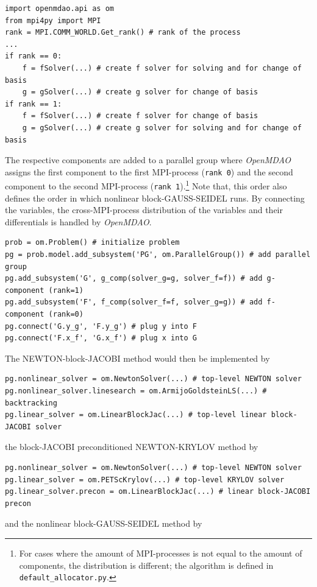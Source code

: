 \documentclass[10pt, ngerman, english,
twoside, open=right,
numbers=noenddot,
declaration=section,
abstract=section,
abstract=multiple,
abstract=notoc,
declaration=notoc,
cd=pale, 
chapterprefix=off, 
chapterpage=false, 
headingsvskip=-10em,
cdgeometry=custom, 
slantedgreek=on,
cdmath=on, 
cdfont=on,
ttfont=false,
mathswap=off,
]{tudscrreprt}
\numberwithin{equation}{chapter}
\renewcommand{\textsc}[1]{\uppercase{\mbox{#1}}}
\begin{document}
\begin{lstlisting}[firstnumber=1]
import openmdao.api as om
from mpi4py import MPI
rank = MPI.COMM_WORLD.Get_rank() # rank of the process
...
if rank == 0:
	f = fSolver(...) # create f solver for solving and for change of basis
	g = gSolver(...) # create g solver for change of basis
if rank == 1:
	f = fSolver(...) # create f solver for change of basis
	g = gSolver(...) # create g solver for solving and for change of basis
\end{lstlisting}
The respective components are added to a parallel group where \textit{OpenMDAO} assigns the first component to the first MPI-process (\texttt{rank 0}) and the second component to the second MPI-process (\texttt{rank 1}).\footnote{For cases where the amount of MPI-processes is not equal to the amount of components, the distribution is different; the algorithm is defined in \texttt{default\_allocator.py}.} Note that, this order also defines the order in which nonlinear block-\textsc{Gau\ss}-\textsc{Seidel} runs.
By connecting the variables, the cross-MPI-process distribution of the variables and their differentials is handled by \textit{OpenMDAO}. 
\begin{lstlisting}[firstnumber=11]
prob = om.Problem() # initialize problem
pg = prob.model.add_subsystem('PG', om.ParallelGroup()) # add parallel group
pg.add_subsystem('G', g_comp(solver_g=g, solver_f=f)) # add g-component (rank=1)
pg.add_subsystem('F', f_comp(solver_f=f, solver_g=g)) # add f-component (rank=0)
pg.connect('G.y_g', 'F.y_g') # plug y into F
pg.connect('F.x_f', 'G.x_f') # plug x into G
\end{lstlisting}
The \textsc{Newton}-block-\textsc{Jacobi} method would then be implemented by
\begin{lstlisting}[firstnumber=17]
pg.nonlinear_solver = om.NewtonSolver(...) # top-level NEWTON solver
pg.nonlinear_solver.linesearch = om.ArmijoGoldsteinLS(...) # backtracking
pg.linear_solver = om.LinearBlockJac(...) # top-level linear block-JACOBI solver
\end{lstlisting}
the block-\textsc{Jacobi} preconditioned \textsc{Newton}-\textsc{Krylov} method by
\begin{lstlisting}[firstnumber=17]
pg.nonlinear_solver = om.NewtonSolver(...) # top-level NEWTON solver
pg.linear_solver = om.PETScKrylov(...) # top-level KRYLOV solver
pg.linear_solver.precon = om.LinearBlockJac(...) # linear block-JACOBI precon
\end{lstlisting}
and the nonlinear block-\textsc{Gau\ss}-\textsc{Seidel} method by\newpage
\end{document}
